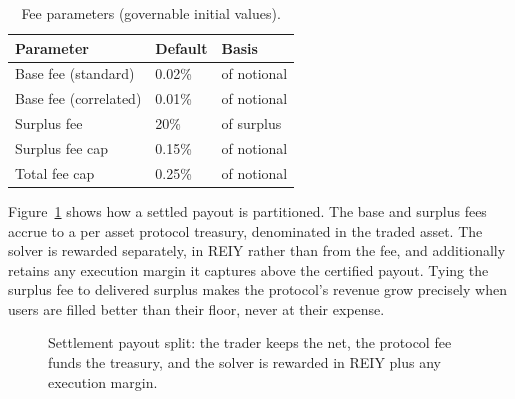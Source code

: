 \documentclass[10pt,sigconf,nonacm]{acmart}
\theoremstyle{reiythm}
\begin{document}
\begin{table}[htbp]
  \centering
  \caption{Fee parameters (governable initial values).}
  \label{tab:fees}
  \begin{tabular}{@{}lll@{}}
    \toprule
    Parameter & Default & Basis \\
    \midrule
    Base fee (standard) & 0.02\% & of notional \\
    Base fee (correlated) & 0.01\% & of notional \\
    Surplus fee & 20\% & of surplus \\
    Surplus fee cap & 0.15\% & of notional \\
    Total fee cap & 0.25\% & of notional \\
    \bottomrule
  \end{tabular}
\end{table}

Figure~\ref{fig:fee} shows how a settled payout is partitioned. The base and
surplus fees accrue to a per asset protocol treasury, denominated in the traded
asset. The solver is rewarded separately, in REIY rather than from the fee, and
additionally retains any execution margin it captures above the certified payout.
Tying the surplus fee to delivered surplus makes the protocol's revenue grow
precisely when users are filled better than their floor, never at their expense.

\begin{figure}[htbp]
  \centering
  \caption{Settlement payout split: the trader keeps the net, the protocol fee
    funds the treasury, and the solver is rewarded in REIY plus any execution
    margin.}
  \label{fig:fee}
\end{figure}
\end{document}
